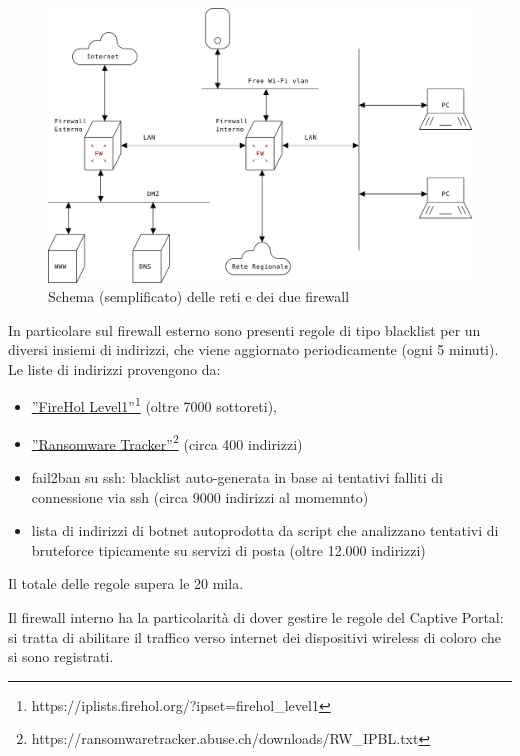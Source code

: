 \begin{figure}
\begin{center}
    \includegraphics[width=\linewidth]{net.svg.png}
    \caption{Schema (semplificato) delle reti e dei due firewall}
    \label{fig:rete}
\end{center}
\end{figure}
In particolare sul firewall esterno sono presenti regole di tipo blacklist per
un diversi insiemi di indirizzi, che viene aggiornato
periodicamente (ogni 5 minuti).  Le liste di indirizzi provengono da:

\begin{itemize}
    \item \href{https://iplists.firehol.org/?ipset=firehol\_level1}{''FireHol
    Level1''}\footnote{https://iplists.firehol.org/?ipset=firehol\_level1} (oltre
    7000 sottoreti),
    \item \href{https://ransomwaretracker.abuse.ch/downloads/RW\_IPBL.txt}{''Ransomware
    Tracker''}\footnote{https://ransomwaretracker.abuse.ch/downloads/RW\_IPBL.txt}
    (circa 400 indirizzi)
    \item fail2ban su ssh: blacklist auto-generata in base ai tentativi
    falliti di connessione via ssh (circa 9000 indirizzi al momemnto)
    \item lista di indirizzi di botnet autoprodotta da script che analizzano
    tentativi di bruteforce tipicamente su servizi di posta (oltre 12.000
    indirizzi)
\end{itemize}
Il totale delle regole supera le 20 mila.

Il firewall interno ha la particolarità di dover gestire le regole del 
Captive Portal: si tratta di abilitare il traffico verso internet dei
dispositivi wireless di coloro che si sono registrati.

